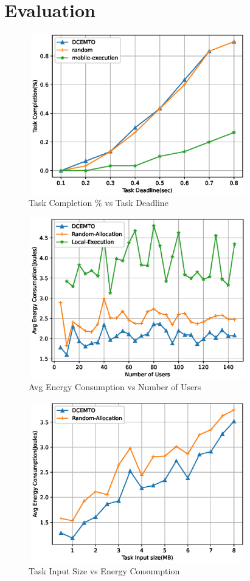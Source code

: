 \documentclass[conference]{IEEEtran}
\begin{document}
\section{Evaluation}

\begin{figure}
\centerline{\includegraphics[width=9.5cm, height=7cm]{F2TaskCompletionvsDeadline.eps}}
\caption{Task Completion \% vs Task Deadline}
\label{fig.2}
\end{figure}

\begin{figure}
\centerline{\includegraphics[width=9.5cm, height=7cm]{F3AvgECvsNoUsers.eps}}
\caption{Avg Energy Consumption vs Number of Users}
\label{fig.3}
\end{figure}

\begin{figure}
\centerline{\includegraphics[width=9.5cm, height=7cm]{F4TaskSizevsAvgEC.eps}}
\caption{Task Input Size vs Energy Consumption}
\label{fig.4}
\end{figure}
\end{document}
